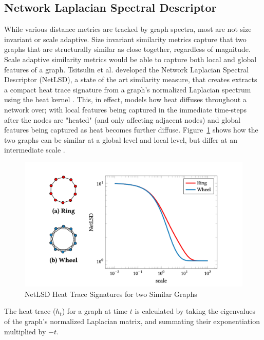 \subsection{Network Laplacian Spectral Descriptor}\label{sec:NetLSD}

While various distance metrics are tracked by graph spectra, most are not size
invariant or scale adaptive. Size invariant similarity metrics capture that two
graphs that are structurally similar as close together, regardless of magnitude.
Scale adaptive similarity metrics would be able to capture both local and global
features of a graph. Tsitsulin et al. developed the Network Laplacian Spectral
Descriptor (NetLSD), a state of the art similarity measure, that creates
extracts a compact heat trace signature from a graph's normalized Laplacian
spectrum using the heat kernel \cite{netlsd}. This, in effect, models how heat
diffuses throughout a network over; with local features being captured in the
immediate time-steps after the nodes are "heated" (and only affecting adjacent
nodes) and global features being captured as heat becomes further diffuse.
Figure~\ref{fig:heat_trace_ex} shows how the two graphs can be similar at a
global level and local level, but differ at an intermediate scale \cite{netlsd}.

\begin{singlespacing}
    \begin{figure}[H]
    \centering
    \includegraphics[scale=0.25]{Figures/heat_trace_ex}
    \caption[NetLSD Heat Trace Signatures for two Similar Graphs]{NetLSD Heat Trace Signatures for two Similar Graphs}
    \label{fig:heat_trace_ex}
    \end{figure}
\end{singlespacing}

The heat trace ($h_{t}$) for a graph at time $t$ is calculated by taking the
eigenvalues of the graph's normalized Laplacian matrix, and summating their
exponentiation multiplied by $-t$. 

